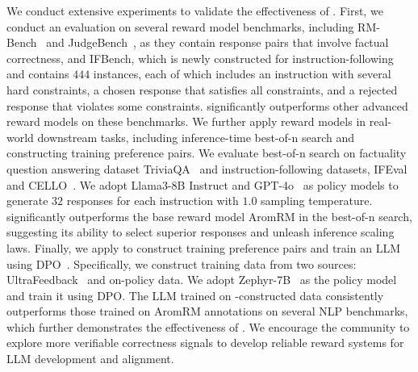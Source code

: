 We conduct extensive experiments to validate the effectiveness of \ourmethod. First, we conduct an evaluation on several reward model benchmarks, including RM-Bench~\citep{liu2024rm} and JudgeBench~\citep{tan2024judgebench}, as they contain response pairs that involve factual correctness, and IFBench, which is newly constructed for instruction-following and contains $444$ instances, each of which includes an instruction with several hard constraints, a chosen response that satisfies all constraints, and a rejected response that violates some constraints. \ourmethod significantly outperforms other advanced reward models on these benchmarks. We further apply reward models in real-world downstream tasks, including inference-time best-of-n search and constructing training preference pairs.
We evaluate best-of-n search on factuality question answering dataset TriviaQA~\citep{joshi2017triviaqa} and instruction-following datasets, IFEval~\citep{zhou2023instruction} and CELLO~\citep{he2024can}. We adopt Llama3-8B Instruct and GPT-4o~\citep{OpenAI20244o} as policy models to generate $32$ responses for each instruction with $1.0$ sampling temperature. 
\ourmethod significantly outperforms the base reward model AromRM in the best-of-n search, suggesting its ability to select superior responses and unleash inference scaling laws.
Finally, we apply \ourmethod to construct training preference pairs and train an LLM using DPO~\citep{rafailov2024direct}.
Specifically, we construct training data from two sources: UltraFeedback~\citep{cui2024ultrafeedback} and on-policy data. We adopt Zephyr-7B~\citep{tunstall2023zephyr} as the policy model and train it using DPO. The LLM trained on \ourmethod-constructed data consistently outperforms those trained on AromRM annotations on several NLP benchmarks, which further demonstrates the effectiveness of \ourmethod. 
We encourage the community to explore more verifiable correctness signals to develop reliable reward systems for LLM development and alignment.